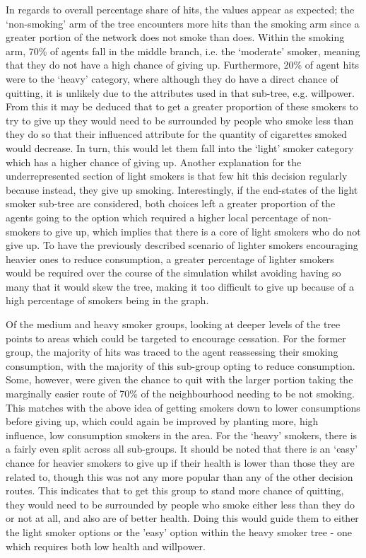 \documentclass[]{report}
\begin{document}
In regards to overall percentage share of hits, the values appear as expected; the `non-smoking' arm of the tree encounters more hits than the smoking arm since a greater portion of the network does not smoke than does. Within the smoking arm, 70\% of agents fall in the middle branch, i.e. the `moderate' smoker, meaning that they do not have a high chance of giving up. Furthermore, 20\% of agent hits were to the `heavy' category, where although they do have a direct chance of quitting, it is unlikely due to the attributes used in that sub-tree, e.g. willpower. From this it may be deduced that to get a greater proportion of these smokers to try to give up they would need to be surrounded by people who smoke less than they do so that their influenced attribute for the quantity of cigarettes smoked would decrease. In turn, this would let them fall into the `light' smoker category which has a higher chance of giving up. Another explanation for the underrepresented section of light smokers is that few hit this decision regularly because instead, they give up smoking. Interestingly, if the end-states of the light smoker sub-tree are considered, both choices left a greater proportion of the agents going to the option which required a higher local percentage of non-smokers to give up, which implies that there is a core of light smokers who do not give up. To have the previously described scenario of lighter smokers encouraging heavier ones to reduce consumption, a greater percentage of lighter smokers would be required over the course of the simulation whilst avoiding having so many that it would skew the tree, making it too difficult to give up because of a high percentage of smokers being in the graph.

Of the medium and heavy smoker groups, looking at deeper levels of the tree points to areas which could be targeted to encourage cessation. For the former group, the majority of hits was traced to the agent reassessing their smoking consumption, with the majority of this sub-group opting to reduce consumption. Some, however, were given the chance to quit with the larger portion taking the marginally easier route of 70\% of the neighbourhood needing to be not smoking. This matches with the above idea of getting smokers down to lower consumptions before giving up, which could again be improved by planting more, high influence, low consumption smokers in the area. For the `heavy' smokers, there is a fairly even split across all sub-groups. It should be noted that there is an `easy' chance for heavier smokers to give up if their health is lower than those they are related to, though this was not any more popular than any of the other decision routes. This indicates that to get this group to stand more chance of quitting, they would need to be surrounded by people who smoke either less than they do or not at all, and also are of better health. Doing this would guide them to either the light smoker options or the 'easy' option within the heavy smoker tree - one which requires both low health and willpower.
\end{document}
